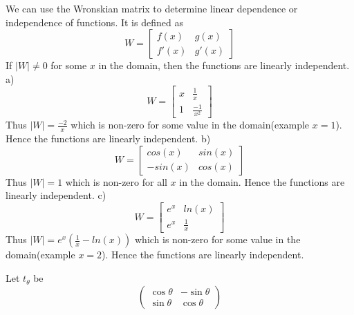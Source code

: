 \documentclass[solution,addpoints,12pt]{exam}
\newenvironment{Solution}{\begin{solution}}{\end{solution}}
\begin{document}
\begin{questions}
\begin{parts}
    \begin{Solution}
    We can use the Wronskian matrix to determine linear dependence or independence of functions. It is defined as 
    \[W = \begin{bmatrix}
        f(x) & g(x) \\
        f'(x) & g'(x)
    \end{bmatrix}\]
    If $|W| \neq 0$ for some $x$ in the domain, then the functions are linearly independent. \newline
    a) \[W = \begin{bmatrix}
        x & \frac{1}{x} \\
        1 & \frac{-1}{x^2}
    \end{bmatrix}\]
    Thus $|W|=\frac{-2}{x}$ which is non-zero for some value in the domain(example $x=1$). Hence the functions are linearly independent. \newline
    b) \[W = \begin{bmatrix}
        cos(x) & sin(x) \\
        -sin(x) & cos(x)
    \end{bmatrix}\]
    Thus $|W|=1$ which is non-zero for all $x$ in the domain. Hence the functions are linearly independent. \newline
    c) \[W = \begin{bmatrix}
        e^{x} & ln(x) \\
        e^{x} & \frac{1}{x}
    \end{bmatrix}\]
    Thus $|W|=e^{x}(\frac{1}{x}-ln(x))$ which is non-zero for some value in the domain(example $x=2$). Hence the functions are linearly independent.
    \end{Solution}
\end{parts}
\question Let $t_{\theta}$ be 
\begin{equation}
    \left( \begin{array}{cc}
     \cos{\theta} & -\sin{\theta} \\
     \sin{\theta} & \cos{\theta}
\end{array} \right)
\end{equation}\\
\begin{parts}

\end{parts}
\end{questions}
\end{document}
